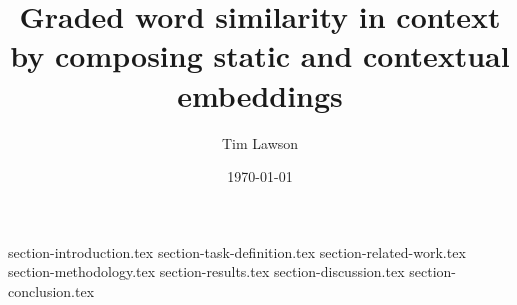 \documentclass[11pt]{extarticle}
\begin{document}
\title{Graded word similarity in context by composing static and contextual embeddings}
\author{Tim Lawson}
\date{\today}

\maketitle

{section-introduction.tex}
{section-task-definition.tex}
{section-related-work.tex}
{section-methodology.tex}
{section-results.tex}
{section-discussion.tex}
{section-conclusion.tex}

\printbibliography
\end{document}
